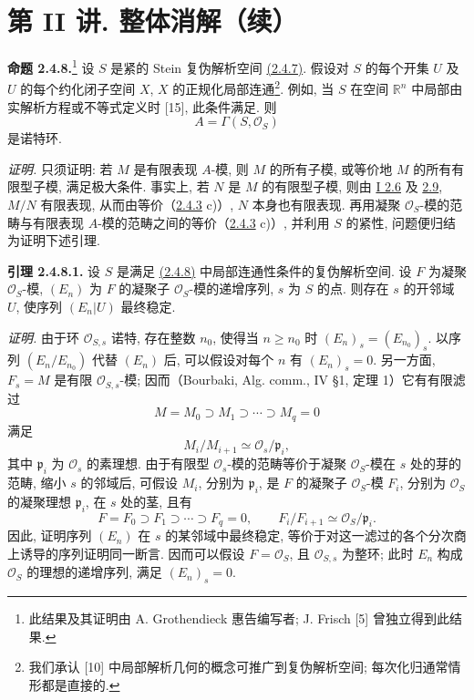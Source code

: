 \section*{第 II 讲. 整体消解（续）}

\textbf{命题 2.4.8.}\footnote{此结果及其证明由 A. Grothendieck 惠告编写者; J. Frisch [5] 曾独立得到此结果.} 设 $S$ 是紧的 Stein 复伪解析空间 \hyperlink{sga6.e02.def.2-4-7}{(2.4.7)}. 假设对 $S$ 的每个开集 $U$ 及 $U$ 的每个约化闭子空间 $X$, $X$ 的正规化局部连通\footnote{我们承认 [10] 中局部解析几何的概念可推广到复伪解析空间; 每次化归通常情形都是直接的.}. 例如, 当 $S$ 在空间 $\mathbb R^n$ 中局部由实解析方程或不等式定义时 [15], 此条件满足. 则
\[
 A=\Gamma(S,\mathcal O_S)
\]
是诺特环.

\emph{证明.} 只须证明: 若 $M$ 是有限表现 $A$-模, 则 $M$ 的所有子模, 或等价地 $M$ 的所有有限型子模, 满足极大条件. 事实上, 若 $N$ 是 $M$ 的有限型子模, 则由 \hyperlink{sga6.e01.schol.2-6}{I 2.6} 及 \hyperlink{sga6.e01.prop.2-9}{2.9}, $M/N$ 有限表现, 从而由等价（\hyperlink{sga6.e02.lem.2-4-3}{2.4.3} c)）, $N$ 本身也有限表现. 再用凝聚 $\mathcal O_S$-模的范畴与有限表现 $A$-模的范畴之间的等价（\hyperlink{sga6.e02.lem.2-4-3}{2.4.3} c)）, 并利用 $S$ 的紧性, 问题便归结为证明下述引理.

\textbf{引理 2.4.8.1.} 设 $S$ 是满足 \hyperlink{sga6.e02.prop.2-4-8}{(2.4.8)} 中局部连通性条件的复伪解析空间. 设 $F$ 为凝聚 $\mathcal O_S$-模, $(E_n)$ 为 $F$ 的凝聚子 $\mathcal O_S$-模的递增序列, $s$ 为 $S$ 的点. 则存在 $s$ 的开邻域 $U$, 使序列 $(E_n|U)$ 最终稳定.

\emph{证明.} 由于环 $\mathcal O_{S,s}$ 诺特, 存在整数 $n_0$, 使得当 $n\geq n_0$ 时 $(E_n)_s=(E_{n_0})_s$. 以序列 $(E_n/E_{n_0})$ 代替 $(E_n)$ 后, 可以假设对每个 $n$ 有 $(E_n)_s=0$. 另一方面, $F_s=M$ 是有限 $\mathcal O_{S,s}$-模; 因而（Bourbaki, Alg. comm., IV §1, 定理 1）它有有限滤过
\[
 M=M_0\supset M_1\supset\cdots\supset M_q=0
\]
满足
\[
 M_i/M_{i+1}\simeq \mathcal O_s/\mathfrak p_i,
\]
其中 $\mathfrak p_i$ 为 $\mathcal O_s$ 的素理想. 由于有限型 $\mathcal O_s$-模的范畴等价于凝聚 $\mathcal O_S$-模在 $s$ 处的芽的范畴, 缩小 $s$ 的邻域后, 可假设 $M_i$, 分别为 $\mathfrak p_i$, 是 $F$ 的凝聚子 $\mathcal O_S$-模 $F_i$, 分别为 $\mathcal O_S$ 的凝聚理想 $\mathfrak p_i$, 在 $s$ 处的茎, 且有
\[
 F=F_0\supset F_1\supset\cdots\supset F_q=0,
 \qquad F_i/F_{i+1}\simeq\mathcal O_S/\mathfrak p_i.
\]
因此, 证明序列 $(E_n)$ 在 $s$ 的某邻域中最终稳定, 等价于对这一滤过的各个分次商上诱导的序列证明同一断言. 因而可以假设 $F=\mathcal O_S$, 且 $\mathcal O_{S,s}$ 为整环; 此时 $E_n$ 构成 $\mathcal O_S$ 的理想的递增序列, 满足 $(E_n)_s=0$.

